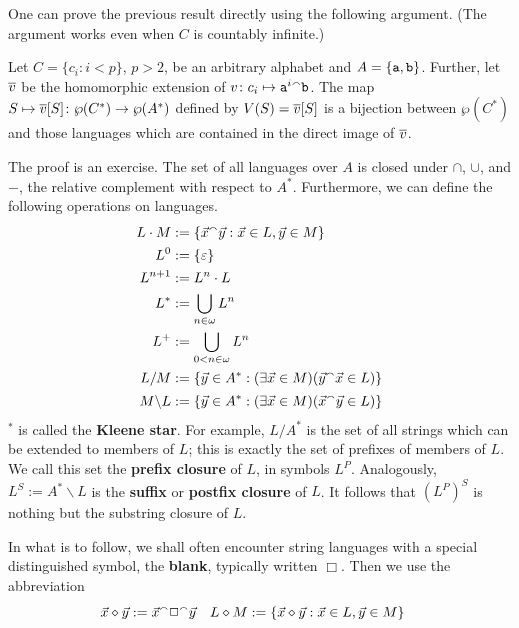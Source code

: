 One can prove the previous result directly using the following argument.
(The argument works even when $C$ is countably infinite.)
\begin{thm}
\label{bijektion}
Let $C = \{c_i : i < p\}$, $p > 2$, be an arbitrary alphabet
and $A = \{\mbox{\tt a}, \mbox{\tt b}\}$.
Further, let $\overline{v}$ be the homomorphic extension of
$v \colon c_i \mapsto {\mbox{\tt a}^i}{^{\smallfrown}} \mbox{\tt b}$. The map
$S \mapsto \overline{v}[S] \colon \wp(C^{\ast}) \rightarrow \wp(A^{\ast})$ defined by
$V(S) = \overline{v}[S]$ is a bijection between $\wp(C^{\ast})$ and
those languages which are contained in the direct image of
$\overline{v}$.
\end{thm}
The proof is an exercise. The set of all languages over $A$ is closed
under $\cap$, $\cup$, and $-$, the relative complement with respect
to $A^{\ast}$.  Furthermore, we can define the following operations on
languages.
\begin{subequations}
\begin{align}
L \cdot M & := \{\vec{x} {^{\smallfrown}} \vec{y} : \vec{x} \in L, \vec{y} \in M\} \\
L^0      & := \{\varepsilon\}\\
L^{n+1}  & := L^n \cdot L\\
L^{\ast} & := \bigcup_{n \in \omega} L^n\\
L^+      & := \bigcup_{0 < n \in\omega} L^n \\
L / M & := \{\vec{y} \in A^{\ast} : (\exists \vec{x} \in M)(\vec{y}{^{\smallfrown}}
\vec{x} \in L)\} \\
M \backslash L & := \{\vec{y} \in A^{\ast} :
    (\exists \vec{x} \in M)(\vec{x}{^{\smallfrown}} \vec{y} \in L)\}
\end{align}
\end{subequations}
$^{\ast}$ is called the \textbf{Kleene star}. For example,
$L/A^{\ast}$ is the set of all strings which can be extended
to members of $L$; this is exactly the set of prefixes of
members of $L$. We call this set the 
\textbf{prefix closure} of $L$, in symbols $L^P$.
Analogously, $L^S := A^{\ast}\backslash L$ is the
\textbf{suffix} or \textbf{postfix closure} 
of $L$. It follows that $(L^P)^S$ is nothing but the substring
closure of $L$.

In what is to follow, we shall often encounter string languages 
with a special distinguished symbol, the \textbf{blank}, 
\index{$\Box$, $\oconc$}%
typically written $\Box$. Then we use the abbreviation 
\begin{align}
\vec{x}\diamond\vec{y} & := \vec{x}{^{\smallfrown}}\Box{^{\smallfrown}}\vec{y} & 
L \diamond M & := \{\vec{x}\diamond\vec{y} : \vec{x} \in L, 
\vec{y} \in M\} 
\end{align}

